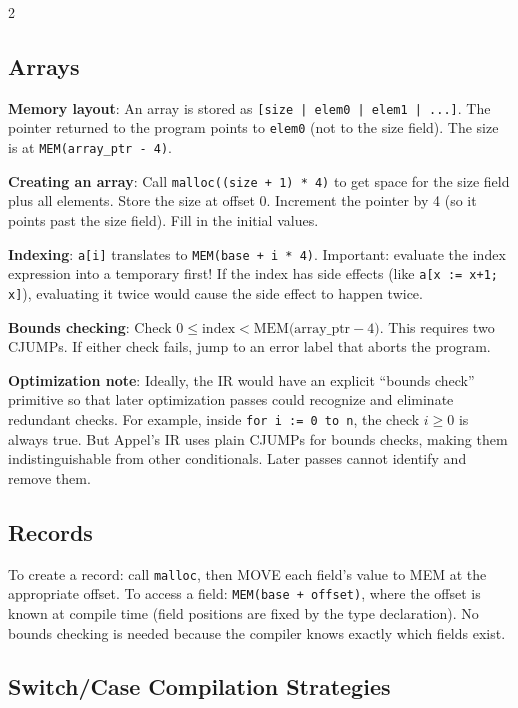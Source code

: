 \documentclass[9pt,landscape]{extarticle}
\begin{document}
\begin{multicols}{2}
\subsection{Arrays}

\textbf{Memory layout}: An array is stored as \texttt{[size | elem0 | elem1 | ...]}. The pointer returned to the program points to \texttt{elem0} (not to the size field). The size is at \texttt{MEM(array\_ptr - 4)}.

\textbf{Creating an array}: Call \texttt{malloc((size + 1) * 4)} to get space for the size field plus all elements. Store the size at offset 0. Increment the pointer by 4 (so it points past the size field). Fill in the initial values.

\textbf{Indexing}: \texttt{a[i]} translates to \texttt{MEM(base + i * 4)}. Important: evaluate the index expression into a temporary first! If the index has side effects (like \texttt{a[x := x+1; x]}), evaluating it twice would cause the side effect to happen twice.

\textbf{Bounds checking}: Check $0 \leq \text{index} < \text{MEM(array\_ptr} - 4)$. This requires two CJUMPs. If either check fails, jump to an error label that aborts the program.

\textbf{Optimization note}: Ideally, the IR would have an explicit ``bounds check'' primitive so that later optimization passes could recognize and eliminate redundant checks. For example, inside \texttt{for i := 0 to n}, the check $i \geq 0$ is always true. But Appel's IR uses plain CJUMPs for bounds checks, making them indistinguishable from other conditionals. Later passes cannot identify and remove them.

\subsection{Records}

To create a record: call \texttt{malloc}, then MOVE each field's value to MEM at the appropriate offset. To access a field: \texttt{MEM(base + offset)}, where the offset is known at compile time (field positions are fixed by the type declaration). No bounds checking is needed because the compiler knows exactly which fields exist.

\subsection{Switch/Case Compilation Strategies}


\end{multicols}
\end{document}
